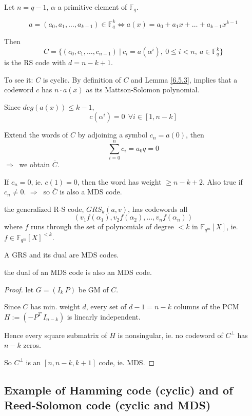 \documentclass{article}
\theoremstyle{definition}
\newenvironment{defn}[1]
{\renewcommand\theinnerdefn{#1}\innerdefn}
{\endinnerdefn}
\newenvironment{thm}[1]
{\renewcommand\theinnerthm{#1}\innerthm}
{\endinnerthm}
\begin{document}
\vspace{0.6cm}
Let $n=q-1$, $\alpha$ a primitive element of $\mathbb{F}_q$.

$$a=(a_0, a_1, \ldots, a_{k-1}) \in \mathbb{F}_q^k \Longleftrightarrow a(x) = a_0 + a_1 x + \ldots + a_{k-1}x^{k-1}$$

Then
$$C= \{ (c_0, c_1, \ldots, c_{n-1}) ~|~ c_i = a(\alpha^i),~ 0 \leq i <n,~ a \in \mathbb{F}_q^k \}$$
is the RS code with $d = n - k +1$.

To see it: $C$ is cyclic. By definition of $C$ and Lemma \ref{6.5.3}, implies that a codeword $c$ has $n \cdot a(x)$ as its Mattson-Solomon polynomial.

Since $deg(a(x)) \leq k-1$,
$$c(\alpha^i) = 0 ~~\forall i \in [1, n-k]$$

Extend the words of $C$ by adjoining a symbol $c_n = a(0)$, then
$$\sum_{i=0}^n c_i = a_0 q = 0$$
$\Longrightarrow~$ we obtain $\overline{C}$.


If $c_n=0$, ie. $c(1)=0$, then the word has weight $\geq n-k+2$. Also true if $c_n \neq 0$.
$\Longrightarrow~$ so $\overline{C}$ is also a MDS code.


\begin{defn}{6.8.2}
  the generalized R-S code, $GRS_k(a, v)$, has codewords all
  $$(v_1 f(\alpha_1), v_2 f(\alpha_2), \ldots, v_n f(\alpha_n))$$
  where $f$ runs through the set of polynomials of degree $<k$ in $\mathbb{F}_{q^m}[X]$, ie. $f \in \mathbb{F}_{q^m}[X]^{<k}$.
\end{defn}

A GRS and its dual are MDS codes.

\begin{thm}{6.8.3}
  the dual of an MDS code is also an MDS code.
\end{thm}
\begin{proof}
  let $G=(I_k~ P)$ be GM of $C$.

  Since $C$ has min. weight $d$, every set of $d-1=n-k$ columns of the PCM $H:=(-P^T ~ I_{n-k})$ is linearly independent.

  Hence every square submatrix of $H$ is nonsingular, ie. no codeword of $C^{\perp}$ has $n-k$ zeros.

  So $C^{\perp}$ is an $[n, n-k, k+1]$ code, ie. MDS.
\end{proof}



\vspace{1.0cm}
\subsection{Example of Hamming code (cyclic) and of Reed-Solomon code (cyclic and MDS)}
\end{document}
